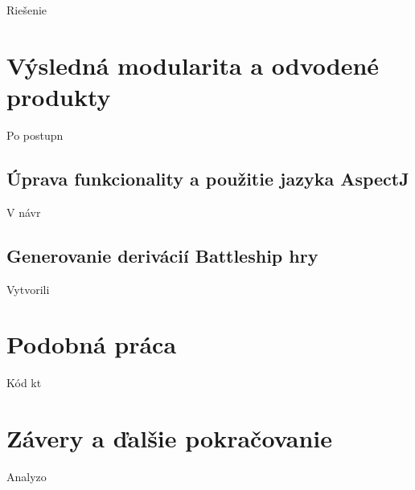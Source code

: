 \documentclass[11pt,slovak,a4paper,twoside]{article}
\begin{document}
Rie\v{s}enie      


\section{Výsledná modularita a odvodené produkty} \label{eval}

Po postupn


\subsection{Úprava funkcionality a použitie jazyka AspectJ} \label{eval-ownDesing}

V návr


\subsection{Generovanie derivácií Battleship hry} \label{eval-javascript}

Vytvorili


\section{Podobná práca} \label{recentwork}

Kód kt


\section{Závery a \v{d}al\v{s}ie pokra\v{c}ovanie} \label{cc}

Analyzo
 


\end{document}
